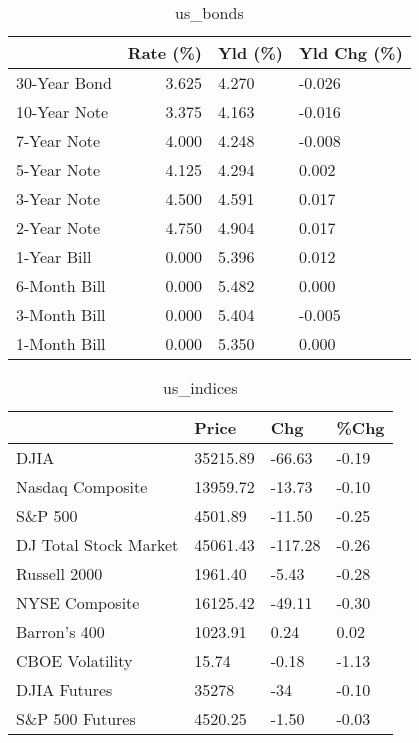 \documentclass{article}%
\begin{document}
%


\begin{table}[htbp]%
\caption{us\_bonds}%
\centering%
\begin{adjustbox}{width=1\textwidth}%
\begin{tabular}{lrll}
\toprule
             &  Rate (\%) & Yld (\%) & Yld Chg (\%) \\
\midrule
30-Year Bond &     3.625 &   4.270 &      -0.026 \\
10-Year Note &     3.375 &   4.163 &      -0.016 \\
 7-Year Note &     4.000 &   4.248 &      -0.008 \\
 5-Year Note &     4.125 &   4.294 &       0.002 \\
 3-Year Note &     4.500 &   4.591 &       0.017 \\
 2-Year Note &     4.750 &   4.904 &       0.017 \\
 1-Year Bill &     0.000 &   5.396 &       0.012 \\
6-Month Bill &     0.000 &   5.482 &       0.000 \\
3-Month Bill &     0.000 &   5.404 &      -0.005 \\
1-Month Bill &     0.000 &   5.350 &       0.000 \\
\bottomrule
\end{tabular}
%
\end{adjustbox}%
\end{table}

%


\begin{table}[htbp]%
\caption{us\_indices}%
\centering%
\begin{adjustbox}{width=1\textwidth}%
\begin{tabular}{llll}
\toprule
                      &    Price &     Chg &  \%Chg \\
\midrule
                 DJIA & 35215.89 &  -66.63 & -0.19 \\
     Nasdaq Composite & 13959.72 &  -13.73 & -0.10 \\
              S\&P 500 &  4501.89 &  -11.50 & -0.25 \\
DJ Total Stock Market & 45061.43 & -117.28 & -0.26 \\
         Russell 2000 &  1961.40 &   -5.43 & -0.28 \\
       NYSE Composite & 16125.42 &  -49.11 & -0.30 \\
         Barron's 400 &  1023.91 &    0.24 &  0.02 \\
      CBOE Volatility &    15.74 &   -0.18 & -1.13 \\
         DJIA Futures &    35278 &     -34 & -0.10 \\
      S\&P 500 Futures &  4520.25 &   -1.50 & -0.03 \\
\bottomrule
\end{tabular}
%
\end{adjustbox}%
\end{table}
\end{document}
